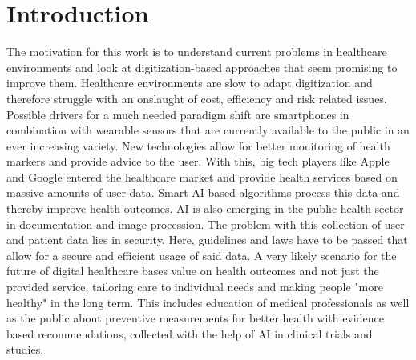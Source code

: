 \section{Introduction}
The motivation for this work is to understand current problems in healthcare environments and look at digitization-based approaches that seem promising to improve them. Healthcare environments are slow to adapt digitization and therefore struggle with an onslaught of cost, efficiency and risk related issues. Possible drivers for a much needed paradigm shift are smartphones in combination with wearable sensors that are currently available to the public in an ever increasing variety. New technologies allow for better monitoring of health markers and provide advice to the user. With this, big tech players like Apple and Google entered the healthcare market and provide health services based on massive amounts of user data. Smart AI-based algorithms process this data and thereby improve health outcomes. AI is also emerging in the public health sector in documentation and image procession. The problem with this collection of user and patient data lies in security. Here, guidelines and laws have to be passed that allow for a secure and efficient usage of said data. A very likely scenario for the future of digital healthcare bases value on health outcomes and not just the provided service, tailoring care to individual needs and making people "more healthy" in the long term. This includes education of medical professionals as well as the public about preventive measurements for better health with evidence based recommendations, collected with the help of AI in clinical trials and studies.


